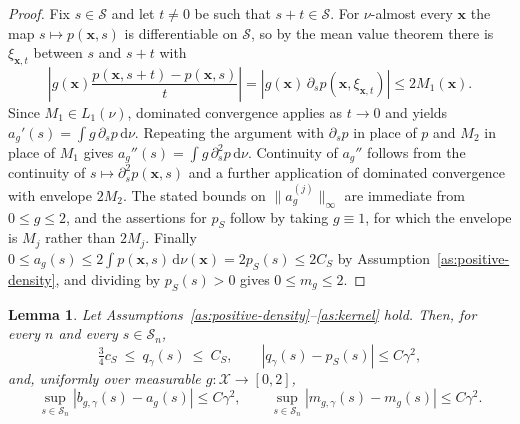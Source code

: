 \documentclass{article} %
\newtheorem{lemma}[theorem]{Lemma}
\begin{document}
\begin{proof}
Fix $s\in\mathcal{S}$ and let $t\ne0$ be such that $s+t\in\mathcal{S}$.  For $\nu$-almost every $\mathbf{x}$ the map $s\mapsto p(\mathbf{x},s)$ is differentiable on $\mathcal{S}$, so by the mean value theorem there is $\xi_{\mathbf{x},t}$ between $s$ and $s+t$ with
\[
  \left|g(\mathbf{x})\frac{p(\mathbf{x},s+t)-p(\mathbf{x},s)}{t}\right|
  =\left|g(\mathbf{x})\,\partial_sp(\mathbf{x},\xi_{\mathbf{x},t})\right|
  \le2M_1(\mathbf{x}) .
\]
Since $M_1\in L_1(\nu)$, dominated convergence applies as $t\to0$ and yields $a_g'(s)=\int g\,\partial_sp\,\mathrm{d}\nu$.  Repeating the argument with $\partial_sp$ in place of $p$ and $M_2$ in place of $M_1$ gives $a_g''(s)=\int g\,\partial_s^2p\,\mathrm{d}\nu$.  Continuity of $a_g''$ follows from the continuity of $s\mapsto\partial_s^2p(\mathbf{x},s)$ and a further application of dominated convergence with envelope $2M_2$.  The stated bounds on $\lVert a_g^{(j)}\rVert_\infty$ are immediate from $0\le g\le2$, and the assertions for $p_S$ follow by taking $g\equiv1$, for which the envelope is $M_j$ rather than $2M_j$.  Finally $0\le a_g(s)\le2\int p(\mathbf{x},s)\,\mathrm{d}\nu(\mathbf{x})=2p_S(s)\le2C_S$ by Assumption~\ref{as:positive-density}, and dividing by $p_S(s)>0$ gives $0\le m_g\le2$.
\end{proof}

\begin{lemma}
\label{lem:bias}
Let Assumptions~\ref{as:positive-density}--\ref{as:kernel} hold.  Then, for every $n$ and every $s\in\mathcal{S}_n$,
\begin{equation}
  \tfrac{3}{4}c_S\ \le\ q_{\gamma}(s)\ \le\ C_S,
  \qquad
  \left|q_{\gamma}(s)-p_S(s)\right|\le C\gamma^2 ,
  \label{eq:denominator-bias}
\end{equation}
and, uniformly over measurable $g:\mathcal{X}\to[0,2]$,
\begin{equation}
  \sup_{s\in\mathcal{S}_n}\left|b_{g,\gamma}(s)-a_g(s)\right|\le C\gamma^2,
  \qquad
  \sup_{s\in\mathcal{S}_n}\left|m_{g,\gamma}(s)-m_g(s)\right|\le C\gamma^2 .
  \label{eq:numerator-bias}
\end{equation}
\end{lemma}
\end{document}
